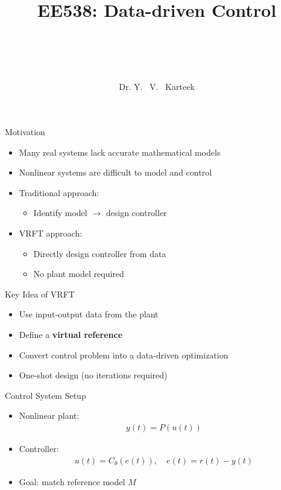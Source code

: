 \documentclass[hyperref={pdfpagemode=FullScreen},aspectratio=169]{beamer}
\title{\Large{EE538: Data-driven Control\\~\\}~\\}
\author{\small Dr. Y. ~V. ~Karteek}
\date{}
\begin{document}
\begin{frame}[plain]
          \begin{center}
                    \Large{}
                    \end{center}
               \titlepage
        \end{frame}


\begin{frame}{Motivation}
\begin{itemize}
\item Many real systems lack accurate mathematical models
\item Nonlinear systems are difficult to model and control
\item Traditional approach:
\begin{itemize}
\item Identify model $\rightarrow$ design controller
\end{itemize}
\item VRFT approach:
\begin{itemize}
\item Directly design controller from data
\item No plant model required
\end{itemize}
\end{itemize}
\end{frame}


\begin{frame}{Key Idea of VRFT}
\begin{itemize}
\item Use input-output data from the plant
\item Define a \textbf{virtual reference}
\item Convert control problem into a data-driven optimization
\item One-shot design (no iterations required)
\end{itemize}
\end{frame}


\begin{frame}{Control System Setup}
\begin{itemize}
\item Nonlinear plant:
\begin{align}
y(t) = P(u(t))
\end{align}
\item Controller:
\begin{align}
u(t) = C_\theta(e(t)), \quad e(t) = r(t) - y(t)
\end{align}
\item Goal: match reference model $M$
\end{itemize}
\end{frame}
\end{document}
